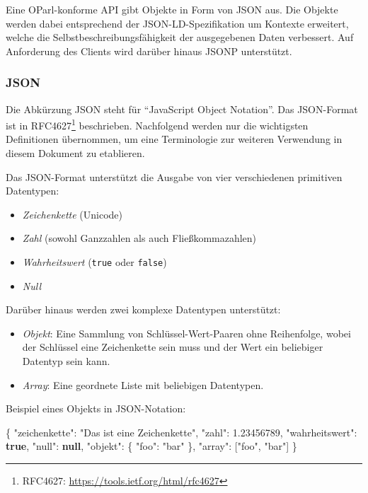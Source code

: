 \documentclass[,a4paper]{article}
\newenvironment{Shaded}{}{}
\newcommand{\KeywordTok}[1]{\textcolor[rgb]{0.00,0.44,0.13}{\textbf{{#1}}}}
\newcommand{\DataTypeTok}[1]{\textcolor[rgb]{0.56,0.13,0.00}{{#1}}}
\newcommand{\FloatTok}[1]{\textcolor[rgb]{0.25,0.63,0.44}{{#1}}}
\newcommand{\StringTok}[1]{\textcolor[rgb]{0.25,0.44,0.63}{{#1}}}
\newcommand{\OtherTok}[1]{\textcolor[rgb]{0.00,0.44,0.13}{{#1}}}
\newcommand{\FunctionTok}[1]{\textcolor[rgb]{0.02,0.16,0.49}{{#1}}}
\begin{document}
Eine OParl-konforme API gibt Objekte in Form von JSON aus. Die Objekte
werden dabei entsprechend der JSON-LD-Spezifikation um Kontexte
erweitert, welche die Selbstbeschreibungsfähigkeit der ausgegebenen
Daten verbessert. Auf Anforderung des Clients wird darüber hinaus JSONP
unterstützt.

\subsubsection{JSON}\label{json}

Die Abkürzung JSON steht für ``JavaScript Object Notation''. Das
JSON-Format ist in RFC4627\footnote{RFC4627:
  \url{https://tools.ietf.org/html/rfc4627}} beschrieben. Nachfolgend
werden nur die wichtigsten Definitionen übernommen, um eine Terminologie
zur weiteren Verwendung in diesem Dokument zu etablieren.

Das JSON-Format unterstützt die Ausgabe von vier verschiedenen
primitiven Datentypen:

\begin{itemize}
\itemsep1pt\parskip0pt
\item
  \emph{Zeichenkette} (Unicode)
\item
  \emph{Zahl} (sowohl Ganzzahlen als auch Fließkommazahlen)
\item
  \emph{Wahrheitswert} (\texttt{true} oder \texttt{false})
\item
  \emph{Null}
\end{itemize}

Darüber hinaus werden zwei komplexe Datentypen unterstützt:

\begin{itemize}
\itemsep1pt\parskip0pt
\item
  \emph{Objekt}: Eine Sammlung von Schlüssel-Wert-Paaren ohne
  Reihenfolge, wobei der Schlüssel eine Zeichenkette sein muss und der
  Wert ein beliebiger Datentyp sein kann.
\item
  \emph{Array}: Eine geordnete Liste mit beliebigen Datentypen.
\end{itemize}

Beispiel eines Objekts in JSON-Notation:

\begin{Shaded}
\begin{Highlighting}[]
\FunctionTok{\{}
    \DataTypeTok{"zeichenkette"}\FunctionTok{:} \StringTok{"Das ist eine Zeichenkette"}\FunctionTok{,}
    \DataTypeTok{"zahl"}\FunctionTok{:} \FloatTok{1.23456789}\FunctionTok{,}
    \DataTypeTok{"wahrheitswert"}\FunctionTok{:} \KeywordTok{true}\FunctionTok{,}
    \DataTypeTok{"null"}\FunctionTok{:} \KeywordTok{null}\FunctionTok{,}
    \DataTypeTok{"objekt"}\FunctionTok{:} \FunctionTok{\{}
        \DataTypeTok{"foo"}\FunctionTok{:} \StringTok{"bar"}
    \FunctionTok{\},}
    \DataTypeTok{"array"}\FunctionTok{:} \OtherTok{[}\StringTok{"foo"}\OtherTok{,} \StringTok{"bar"}\OtherTok{]}
\FunctionTok{\}}
\end{Highlighting}
\end{Shaded}
\end{document}
